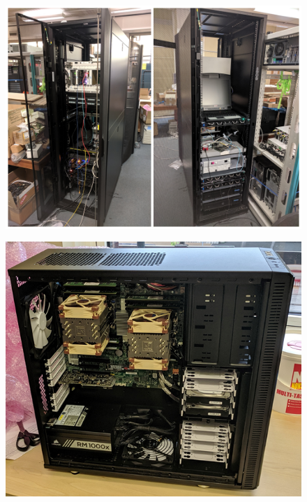 \begin{figure}[htbp]
\centering
\includegraphics[width=0.7\linewidth]{Chapter3/Figs/Raster/detCon042b_Rack1.png}
\label{fig:detCon042b_Rack1}
\end{figure}

\begin{figure}[htbp]
\centering
\includegraphics[width=0.8\linewidth]{Chapter3/Figs/Raster/detCon044_NewComputer.png}
\label{fig:detCon044_NewComputer}
\end{figure}


